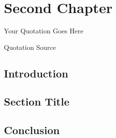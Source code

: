 
\chapter{Second Chapter}
\epigraph{Your Quotation Goes Here}{Quotation Source}

\section{Introduction}
\lipsum[5-8]

\section{Section Title}
\lipsum[11-16]

\section{Conclusion}
\lipsum[58]